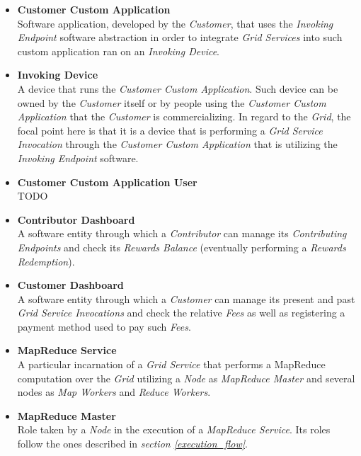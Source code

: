 \begin{itemize}
    \item \textbf{Customer Custom Application}\label{customer_custom_application}\\
    Software application, developed by the \textit{Customer}, that uses the \textit{Invoking Endpoint} software abstraction in order to integrate \textit{Grid Services} into such custom application ran on an \textit{Invoking Device}.
    \vspace{10mm}
    \item \textbf{Invoking Device}\label{invoking_device}\\
    A device that runs the \textit{Customer Custom Application}. Such device can be owned by the \textit{Customer} itself or by people using the \textit{Customer Custom Application} that the \textit{Customer} is commercializing. In regard to the \textit{Grid}, the focal point here is that it is a device that is performing a \textit{Grid Service Invocation} through the \textit{Customer Custom Application} that is utilizing the \textit{Invoking Endpoint} software.
    \item \textbf{Customer Custom Application User}\label{customer_custom_application_user}\\
    TODO
    \item \textbf{Contributor Dashboard}\label{contributor_dashboard}\\
    A software entity through which a \textit{Contributor} can manage its \textit{Contributing Endpoints} and check its \textit{Rewards Balance} (eventually performing a \textit{Rewards Redemption}).
    \item \textbf{Customer Dashboard}\label{customer_dashboard}\\
    A software entity through which a \textit{Customer} can manage its present and past \textit{Grid Service Invocations} and check the relative \textit{Fees} as well as registering a payment method used to pay such \textit{Fees}.
    \item \textbf{MapReduce Service}\label{mapreduce_service}\\
    A particular incarnation of a \textit{Grid Service} that performs a MapReduce computation over the \textit{Grid} utilizing a \textit{Node} as \textit{MapReduce Master} and several nodes as \textit{Map Workers} and \textit{Reduce Workers}.
    \item \textbf{MapReduce Master}\label{mapreduce_master}\\
    Role taken by a \textit{Node} in the execution of a \textit{MapReduce Service}. Its roles follow the ones described in \textit{section \ref{execution_flow}}.

\end{itemize}

